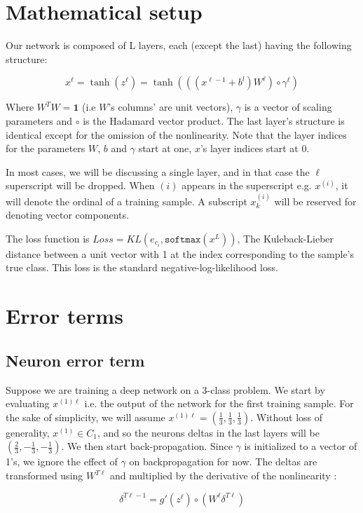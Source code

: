 \documentclass[]{article}
\begin{document}
 	\section{Mathematical setup}
 		Our network is composed of \textsf{L} layers, each (except the last) having the following structure:
 		
 		$$x^\ell = \tanh(z^\ell) = \tanh(((x^{\ell-1}+b^l)W^\ell)\circ \gamma^\ell)$$
 		
 		Where $W^T W=\mathbf{1}$ (i.e $W$'s columns' are unit vectors), $\gamma$ is a vector of scaling parameters and $\circ$ is the Hadamard vector product. The last layer's structure is identical except for the omission of the nonlinearity. Note that the layer indices for the parameters $W$, $b$ and $\gamma$ start at one, $x$'s layer indices start at 0.
 		
 		In most cases, we will be discussing a single layer, and in that case the $\ell$ superscript will be dropped. When $(i)$ appears in the superscript e.g. $x^{(i)}$, it will denote the ordinal of a training sample. A subscript $x^{(i)}_k$ will be reserved for denoting vector components.
 		
 		
 		The loss function is $Loss=KL(e_{c_i}, \mathtt{softmax}(x^L))$, The Kuleback-Lieber distance between a unit vector with 1 at the index corresponding to the sample's true class. This loss is the standard negative-log-likelihood loss.
 		
 		
 	\section{Error terms}
 	\subsection{Neuron error term}
 		Suppose we are training a deep network on a 3-class problem. We start by evaluating $x^{(1)\ell}$ i.e. the output of the network for the first training sample. For the sake of simplicity, we will assume $x^{(1)\ell} = \left(\frac{1}{3},\frac{1}{3},\frac{1}{3}\right)$. Without loss of generality, $x^{(1)} \in C_1$, and so the neurons deltas in the last layers will be  $\left(\frac{2}{3},-\frac{1}{3},-\frac{1}{3}\right)$.
 		We then start back-propagation. Since $\gamma$ is initialized to a vector of 1's, we ignore the effect of $\gamma$ on backpropagation for now. The deltas are transformed using $W^{T\ell}$ and multiplied by the derivative of the nonlinearity :
 		
 		$$ \delta^{T\ell-1} = g'(z^{\ell}) \circ (W^{\ell}\delta^{T\ell})$$
 		
\end{document}
